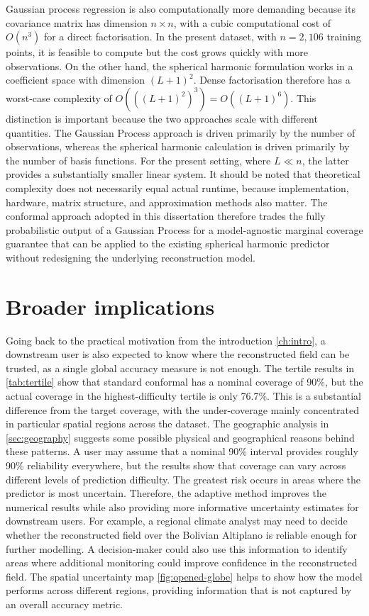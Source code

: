 \documentclass[11pt,a4paper]{report}
\begin{document}
Gaussian process regression is also computationally more demanding because its covariance matrix has dimension $n\times n$, with a cubic computational cost of $O(n^3)$ for a direct factorisation. In the present dataset, with $n=2{,}106$ training points, it is feasible to compute but the cost grows quickly with more observations. On the other hand, the spherical harmonic formulation works in a coefficient space with dimension $(L+1)^2$. Dense factorisation therefore has a worst-case complexity of $O(((L+1)^2)^3)=O((L+1)^6)$. This distinction is important because the two approaches scale with different quantities. The Gaussian Process approach is driven primarily by the number of observations, whereas the spherical harmonic calculation is driven primarily by the number of basis functions. For the present setting, where $L\ll n$, the latter provides a substantially smaller linear system. It should be noted that theoretical complexity does not necessarily equal actual runtime, because implementation, hardware, matrix structure, and approximation methods also matter. The conformal approach adopted in this dissertation therefore trades the fully probabilistic output of a Gaussian Process for a model-agnostic marginal coverage guarantee that can be applied to the existing spherical harmonic predictor without redesigning the underlying reconstruction model.

\section{Broader implications}

Going back to the practical motivation from the introduction \cref{ch:intro}, a downstream user is also expected to know where the reconstructed field can be trusted, as a single global accuracy measure is not enough. The tertile results in \cref{tab:tertile} show that standard conformal has a nominal coverage of 90\%, but the actual coverage in the highest-difficulty tertile is only 76.7\%. This is a substantial difference from the target coverage, with the under-coverage mainly concentrated in particular spatial regions across the dataset. The geographic analysis in \cref{sec:geography} suggests some possible physical and geographical reasons behind these patterns. A user may assume that a nominal 90\% interval provides roughly 90\% reliability everywhere, but the results show that coverage can vary across different levels of prediction difficulty. The greatest risk occurs in areas where the predictor is most uncertain. Therefore, the adaptive method improves the numerical results while also providing more informative uncertainty estimates for downstream users. For example, a regional climate analyst may need to decide whether the reconstructed field over the Bolivian Altiplano is reliable enough for further modelling. A decision-maker could also use this information to identify areas where additional monitoring could improve confidence in the reconstructed field. The spatial uncertainty map \cref{fig:opened-globe} helps to show how the model performs across different regions, providing information that is not captured by an overall accuracy metric.
\end{document}
